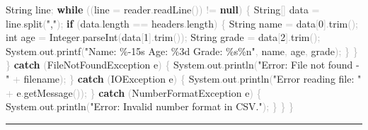 \documentclass[
  justified,
  openright,
]{tufte-book}
\newcommand{\KeywordTok}[1]{\textcolor{CodeKeyword}{\textbf{#1}}}  %
\newcommand{\StringTok}[1]{\textcolor{CodeString}{#1}}              %
\newcommand{\CodeNumTok}[1]{\textcolor{CodeNumber}{#1}}             %
\newcommand{\CodeFuncTok}[1]{\textcolor{CodeKeyword}{#1}}           %
\newcommand{\CodeTypeTok}[1]{\textcolor{CodeType}{#1}}              %
\newcommand{\OperatorTok}[1]{\textcolor{DarkGray}{#1}}              %
\newenvironment{Shaded}{%
  \begin{mdframed}[style=TufteCode]%
}{%
  \end{mdframed}%
}
\begin{document}
\begin{Shaded}
\begin{Highlighting}[]
            String line\OperatorTok{;}
            \KeywordTok{while} \OperatorTok{((}line \OperatorTok{=} reader\OperatorTok{.}\CodeFuncTok{readLine}\OperatorTok{())} \OperatorTok{!=} \KeywordTok{null}\OperatorTok{)} \OperatorTok{\{}
                String\OperatorTok{[]} data \OperatorTok{=} line\OperatorTok{.}\CodeFuncTok{split}\OperatorTok{(}\StringTok{","}\OperatorTok{);}
                \KeywordTok{if} \OperatorTok{(}data\OperatorTok{.}\CodeFuncTok{length} \OperatorTok{==} headers\OperatorTok{.}\CodeFuncTok{length}\OperatorTok{)} \OperatorTok{\{}
                    String name \OperatorTok{=} data\OperatorTok{[}\CodeNumTok{0}\OperatorTok{].}\CodeFuncTok{trim}\OperatorTok{();}
                    \CodeTypeTok{int} age \OperatorTok{=} Integer\OperatorTok{.}\CodeFuncTok{parseInt}\OperatorTok{(}data\OperatorTok{[}\CodeNumTok{1}\OperatorTok{].}\CodeFuncTok{trim}\OperatorTok{());}
                    String grade \OperatorTok{=} data\OperatorTok{[}\CodeNumTok{2}\OperatorTok{].}\CodeFuncTok{trim}\OperatorTok{();}
                    System\OperatorTok{.}\CodeFuncTok{out}\OperatorTok{.}\CodeFuncTok{printf}\OperatorTok{(}\StringTok{"Name: }\StringTok{\%{-}15s}\StringTok{ Age: }\StringTok{\%3d}\StringTok{  Grade: }\StringTok{\%s\%n}\StringTok{"}\OperatorTok{,}
                                      name\OperatorTok{,} age\OperatorTok{,} grade\OperatorTok{);}
                \OperatorTok{\}}
            \OperatorTok{\}}
        \OperatorTok{\}} \KeywordTok{catch} \OperatorTok{(}FileNotFoundException e\OperatorTok{)} \OperatorTok{\{}
            System\OperatorTok{.}\CodeFuncTok{out}\OperatorTok{.}\CodeFuncTok{println}\OperatorTok{(}\StringTok{"Error: File not found {-} "} \OperatorTok{+} filename\OperatorTok{);}
        \OperatorTok{\}} \KeywordTok{catch} \OperatorTok{(}IOException e\OperatorTok{)} \OperatorTok{\{}
            System\OperatorTok{.}\CodeFuncTok{out}\OperatorTok{.}\CodeFuncTok{println}\OperatorTok{(}\StringTok{"Error reading file: "} \OperatorTok{+} e\OperatorTok{.}\CodeFuncTok{getMessage}\OperatorTok{());}
        \OperatorTok{\}} \KeywordTok{catch} \OperatorTok{(}NumberFormatException e\OperatorTok{)} \OperatorTok{\{}
            System\OperatorTok{.}\CodeFuncTok{out}\OperatorTok{.}\CodeFuncTok{println}\OperatorTok{(}\StringTok{"Error: Invalid number format in CSV."}\OperatorTok{);}
        \OperatorTok{\}}
    \OperatorTok{\}}
\OperatorTok{\}}
\end{Highlighting}
\end{Shaded}

\begin{center}\rule{0.5\linewidth}{0.5pt}\end{center}
\end{document}
